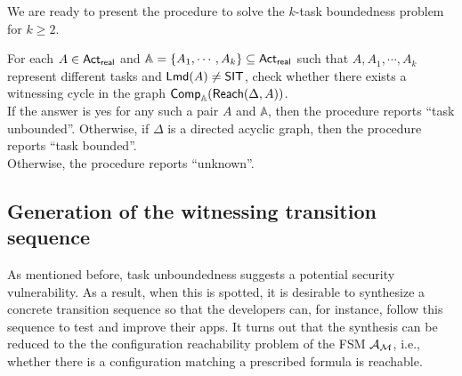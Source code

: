 We are ready to present the procedure to solve the $k$-task boundedness problem for $k \ge 2$. 
\begin{tcolorbox}[width=1.0\linewidth, title={Algorithm to solve the $k$-task boundedness problem for $k \ge 2$}]
 For each $A \in {\sf Act}_{\sf real}$ and $\mathbb{A} = \{A_1, \cdots, A_k\} \subseteq {\sf Act}_{\sf real}$ such that $A,A_1, \cdots, A_k$ represent different tasks and ${\sf Lmd}(A) \neq {\sf SIT}$, check whether there exists a witnessing cycle in the graph ${\sf Comp}_\mathbb{A}({\sf Reach}(\Delta, A))$. \\
If the answer is yes for any such a pair $A$ and $\mathbb{A}$, then the procedure reports ``task unbounded''. Otherwise, if 
$\Delta$ is a directed acyclic graph, then the procedure reports ``task bounded''. \\
Otherwise, the procedure reports ``unknown''.
\end{tcolorbox}

\subsection*{Generation of the witnessing transition sequence}

As mentioned before, task unboundedness suggests %
a potential security vulnerability. As a result, when this is spotted, it is desirable to synthesize a concrete transition sequence so that the developers can, for instance, follow this sequence to test and improve  their apps.  It turns out that the synthesis can be reduced to the the configuration reachability problem of the FSM ${\mathcal{A} }_{{\mathcal{M} }}$, i.e., whether there is a configuration matching a prescribed formula is reachable.

